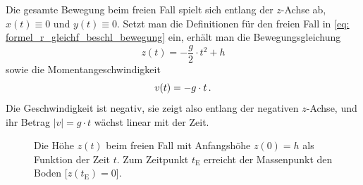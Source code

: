 Die gesamte Bewegung beim freien Fall spielt sich entlang der $z$-Achse ab, \gDh $x(t) \equiv 0$ und $y(t) \equiv 0$. Setzt man die Definitionen für den freien Fall in \cref{eq: formel_r_gleichf_beschl_bewegung} ein, erhält man die Bewegungsgleichung
\begin{equation}\label{eq: bewegungsgleichung_z_freier_fall}
    z(t) = -\frac{g}{2}\cdot t^2 + h 
\end{equation}
sowie die Momentangeschwindigkeit 
\begin{equation}
    v(t) = -g\cdot t \,.
\end{equation}
Die Geschwindigkeit ist negativ, sie zeigt also entlang der negativen $z$-Achse, und ihr Betrag $|v| = g\cdot t$ wächst linear mit der Zeit. 
\begin{figure}[htb]
    \centering
    \caption{Die Höhe $z(t)$ beim freien Fall mit Anfangshöhe $z(0) = h$ als Funktion der Zeit $t$. Zum Zeitpunkt $t_\mathrm{E}$ erreicht der Massenpunkt den Boden [$z(t_\mathrm{E}) = 0$].}\label{fig: freier_Fall}
\end{figure}
